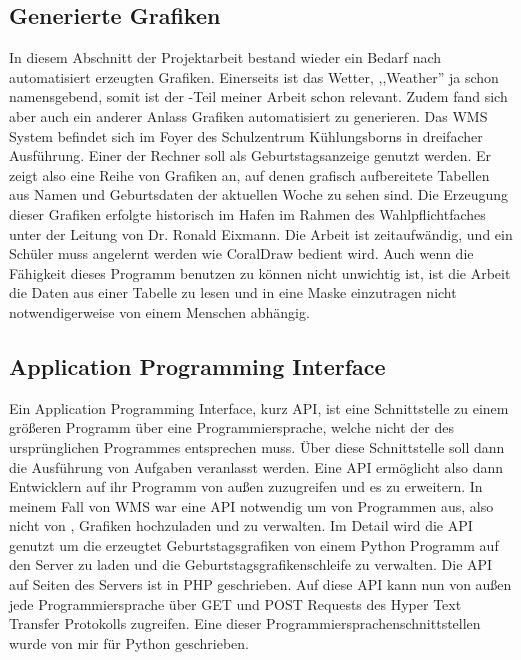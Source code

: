 \subsection{Generierte Grafiken}
\label{sub:Generierte Grafiken}
In diesem Abschnitt der Projektarbeit bestand wieder ein Bedarf nach automatisiert erzeugten Grafiken.
Einerseits ist das Wetter, ,,Weather'' ja schon namensgebend, somit ist der \vs -Teil meiner Arbeit schon relevant.
Zudem fand sich aber auch ein anderer Anlass Grafiken automatisiert zu generieren.
Das WMS System befindet sich im Foyer des Schulzentrum Kühlungsborns in dreifacher Ausführung.
Einer der Rechner soll als Geburtstagsanzeige genutzt werden.
Er zeigt also eine Reihe von Grafiken an, auf denen grafisch aufbereitete Tabellen aus Namen und Geburtsdaten der aktuellen Woche zu sehen sind.
Die Erzeugung dieser Grafiken erfolgte historisch im Hafen im Rahmen des Wahlpflichtfaches unter der Leitung von Dr. Ronald Eixmann.
Die Arbeit ist zeitaufwändig, und ein Schüler muss angelernt werden wie CoralDraw bedient wird.
Auch wenn die Fähigkeit dieses Programm benutzen zu können nicht unwichtig ist, ist die Arbeit die
Daten aus einer Tabelle zu lesen und in eine Maske einzutragen nicht notwendigerweise von einem Menschen abhängig.\\

\subsection{Application Programming Interface}
\label{sub:wmsapi}
Ein Application Programming Interface, kurz API, ist eine Schnittstelle zu einem größeren Programm
über eine Programmiersprache, welche nicht der des ursprünglichen Programmes entsprechen muss.
Über diese Schnittstelle soll dann die Ausführung von Aufgaben veranlasst werden.
Eine API ermöglicht also dann Entwicklern auf ihr Programm von außen zuzugreifen und es zu erweitern.
In meinem Fall von WMS war eine API notwendig um von Programmen aus, also nicht von , Grafiken hochzuladen und zu verwalten.
Im Detail wird die API genutzt um die erzeugtet Geburtstagsgrafiken von einem Python Programm auf den Server zu laden und die Geburtstagsgrafikenschleife zu verwalten.
Die API auf Seiten des Servers ist in PHP geschrieben.
Auf diese API kann nun von außen jede Programmiersprache über GET und POST Requests des Hyper Text Transfer Protokolls zugreifen.
Eine dieser Programmiersprachenschnittstellen wurde von mir für Python geschrieben.

